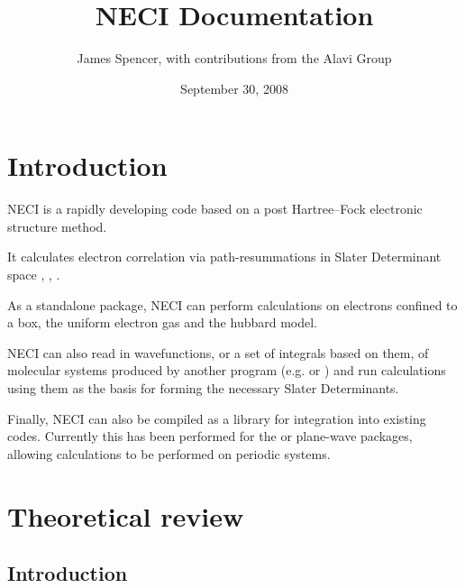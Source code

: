 \documentclass[openany,a4paper,10pt]{manual}
\title{NECI Documentation}
\date{September 30, 2008}
\author{James Spencer, with contributions from the Alavi Group}
\begin{document}
\maketitle
\tableofcontents



\resetcurrentobjects


\hypertarget{introduction}{}\chapter{Introduction}

NECI is a rapidly developing code based on a post Hartree--Fock electronic structure method.

It calculates electron correlation via path-resummations in Slater Determinant space \cite{SumPaper}, \cite{StarPaper}, \cite{ThomPhDThesis}.

As a standalone package, NECI can perform calculations on electrons confined to a box, the uniform electron gas and the hubbard model.

NECI can also read in wavefunctions, or a set of integrals based on them, of molecular systems produced by another program (e.g. \cite{DALTON} or \cite{MolPro}) and run calculations using them as the basis for forming the necessary Slater Determinants.

Finally, NECI can also be compiled as a library for integration into existing codes.  Currently this has been performed for the \cite{CPMD} or \cite{VASP} plane-wave packages, allowing calculations to be performed on periodic systems.

\resetcurrentobjects


\hypertarget{theory-index}{}\chapter{Theoretical review}

\resetcurrentobjects


\hypertarget{theory-introduction}{}\section{Introduction}
\end{document}
